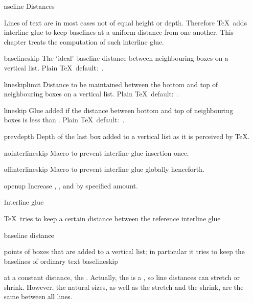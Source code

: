 \subject[baseline] Baseline Distances

\hbox{}\vfil\vfil\hbox{}
Lines of text are in most cases not of equal height or depth.
Therefore \TeX\ adds interline glue to keep baselines at a uniform
distance from one another. 
This chapter treats the computation of such
interline glue.

\invent

\item baselineskip 
      The `ideal' baseline distance between neighbouring 
      boxes on a vertical list. Plain \TeX\ default:~\n{12pt}.

\item lineskiplimit 
      Distance to be maintained between the bottom and top of 
      neighbouring boxes on a vertical list.
      Plain \TeX\ default:~\n{0pt}.

\item lineskip  
      Glue added if the distance between bottom
      and top of neighbouring boxes 
      is less than .
      Plain \TeX\ default:~\n{1pt}.

\item prevdepth  
      Depth of the last box added to a vertical list as it is 
      perceived by \TeX.

\item nointerlineskip
      Macro to prevent interline glue insertion once.

\item offinterlineskip
      Macro to prevent interline glue globally
      henceforth.

\item openup
      Increase , , 
      and  by specified amount.

\inventstop


\hbox{}\vfil\hbox{}

\point Interline glue



\TeX\ tries to keep a certain distance between the reference
\term interline glue\par\term baseline distance\par
points of boxes that are added to a vertical list;
in particular it tries to keep the baselines of ordinary text
\csterm baselineskip\par
at a constant distance, the . Actually,
the  is  a , so line distances can
stretch or shrink. However, the natural sizes,
as well as the stretch and the shrink, are the same
between all lines.

